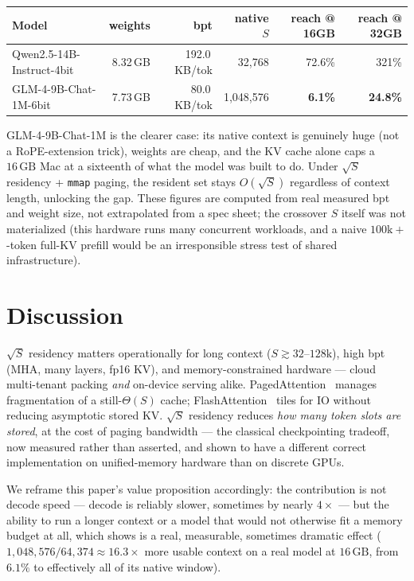 \documentclass[11pt]{article}
\begin{document}
\begin{center}
\begin{tabular}{@{}lrrrrr@{}}
\toprule
Model & weights & bpt & native $S$ & reach @ 16GB & reach @ 32GB \\
\midrule
Qwen2.5-14B-Instruct-4bit & 8.32\,GB & 192.0\,KB/tok & 32{,}768 & 72.6\% & 321\% \\
GLM-4-9B-Chat-1M-6bit & 7.73\,GB & 80.0\,KB/tok & 1{,}048{,}576 & \textbf{6.1\%} & \textbf{24.8\%} \\
\bottomrule
\end{tabular}
\end{center}
GLM-4-9B-Chat-1M is the clearer case: its native context is genuinely huge
(not a RoPE-extension trick), weights are cheap, and the KV cache alone
caps a $16\,\mathrm{GB}$ Mac at a sixteenth of what the model was built to
do. Under $\sqrt{S}$ residency + \texttt{mmap} paging, the resident set
stays $O(\sqrt{S})$ regardless of context length, unlocking the gap. These
figures are computed from real measured bpt and weight size, not
extrapolated from a spec sheet; the crossover $S$ itself was not
materialized (this hardware runs many concurrent workloads, and a naive
$100\mathrm{k}{+}$-token full-KV prefill would be an irresponsible stress
test of shared infrastructure).

\section{Discussion}

$\sqrt{S}$ residency matters operationally for long context
($S\gtrsim 32$--$128\mathrm{k}$), high bpt (MHA, many layers, fp16 KV), and
memory-constrained hardware --- cloud multi-tenant packing \emph{and}
on-device serving alike. PagedAttention~\cite{kwon2023vllm} manages
fragmentation of a still-$\Theta(S)$ cache; FlashAttention~\cite{dao2022flash}
tiles for IO without reducing asymptotic stored KV. $\sqrt{S}$ residency
reduces \emph{how many token slots are stored}, at the cost of paging
bandwidth --- the classical checkpointing tradeoff, now measured rather
than asserted, and shown to have a different correct implementation on
unified-memory hardware than on discrete GPUs.

We reframe this paper's value proposition accordingly: the contribution is
not decode speed --- decode is reliably slower, sometimes by nearly $4\times$
--- but the ability to run a longer context or a model that would not
otherwise fit a memory budget at all, which  shows is a real,
measurable, sometimes dramatic effect ($1{,}048{,}576/64{,}374\approx 16.3\times$
more usable context on a real model at $16\,\mathrm{GB}$, from $6.1\%$ to
effectively all of its native window).
\end{document}
